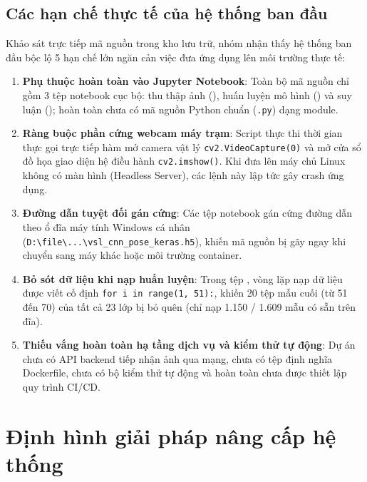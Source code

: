 \subsection{Các hạn chế thực tế của hệ thống ban đầu}
\label{subsec:han_che_ban_dau}

Khảo sát trực tiếp mã nguồn trong kho lưu trữ, nhóm nhận thấy hệ thống ban đầu bộc lộ 5 hạn chế lớn ngăn cản việc đưa ứng dụng lên môi trường thực tế:

\begin{enumerate}
    \item \textbf{Phụ thuộc hoàn toàn vào Jupyter Notebook}: Toàn bộ mã nguồn chỉ gồm 3 tệp notebook cục bộ: thu thập ảnh (), huấn luyện mô hình () và suy luận (); hoàn toàn chưa có mã nguồn Python chuẩn (\texttt{.py}) dạng module.
    \item \textbf{Ràng buộc phần cứng webcam máy trạm}: Script thực thi thời gian thực  gọi trực tiếp hàm mở camera vật lý \texttt{cv2.VideoCapture(0)} và mở cửa sổ đồ họa giao diện hệ điều hành \texttt{cv2.imshow()}. Khi đưa lên máy chủ Linux không có màn hình (Headless Server), các lệnh này lập tức gây crash ứng dụng.
    \item \textbf{Đường dẫn tuyệt đối gán cứng}: Các tệp notebook gán cứng đường dẫn theo ổ đĩa máy tính Windows cá nhân (\texttt{D:\textbackslash file\textbackslash ...\textbackslash vsl\_cnn\_pose\_keras.h5}), khiến mã nguồn bị gãy ngay khi chuyển sang máy khác hoặc môi trường container.
    \item \textbf{Bỏ sót dữ liệu khi nạp huấn luyện}: Trong tệp , vòng lặp nạp dữ liệu được viết cố định \texttt{for i in range(1, 51):}, khiến 20 tệp mẫu cuối (từ 51 đến 70) của tất cả 23 lớp bị bỏ quên (chỉ nạp 1.150 / 1.609 mẫu có sẵn trên đĩa).
    \item \textbf{Thiếu vắng hoàn toàn hạ tầng dịch vụ và kiểm thử tự động}: Dự án chưa có API backend tiếp nhận ảnh qua mạng, chưa có tệp định nghĩa Dockerfile, chưa có bộ kiểm thử tự động và hoàn toàn chưa được thiết lập quy trình CI/CD.
\end{enumerate}


\section{Định hình giải pháp nâng cấp hệ thống}
\label{sec:giai_phap_nang_cap}

